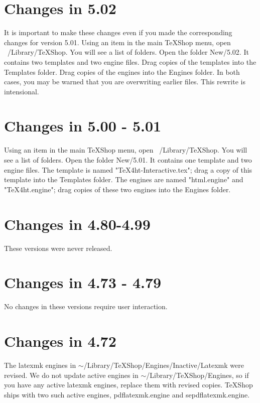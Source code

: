 \documentclass[11pt, oneside]{amsart}
\begin{document}
\section{Changes in 5.02}

It is important to make these changes even if you made the corresponding changes for version 5.01. Using an item in the main TeXShop menu, open ~/Library/TeXShop. You will see a list of folders. Open the folder New/5.02. It contains two templates and two engine files. Drag copies of the templates into the Templates folder. Drag copies of the engines into the Engines folder.  In both cases, you may be warned that you are overwriting earlier files. This rewrite is intensional. 

\section{Changes in 5.00 - 5.01}

Using an item in the main TeXShop menu, open ~/Library/TeXShop. You will see a list of folders. Open the folder New/5.01. It contains one template and two engine files. The template is named "TeX4ht-Interactive.tex"; drag a copy of this template into the Templates folder. The engines are named "html.engine" and "TeX4ht.engine"; drag copies of these two engines into the Engines folder. 

\section{Changes in 4.80-4.99}

These versions were never released.

\section{Changes in 4.73 - 4.79}

No changes in these versions require user interaction. 

\section{Changes in 4.72}

The latexmk engines in $\sim$/Library/TeXShop/Engines/Inactive/Latexmk were revised. We do not update active engines in $\sim$/Library/TeXShop/Engines, so if you have any active latexmk engines, replace them with revised copies. TeXShop ships with two such active engines, pdflatexmk.engine and sepdflatexmk.engine.
\end{document}
